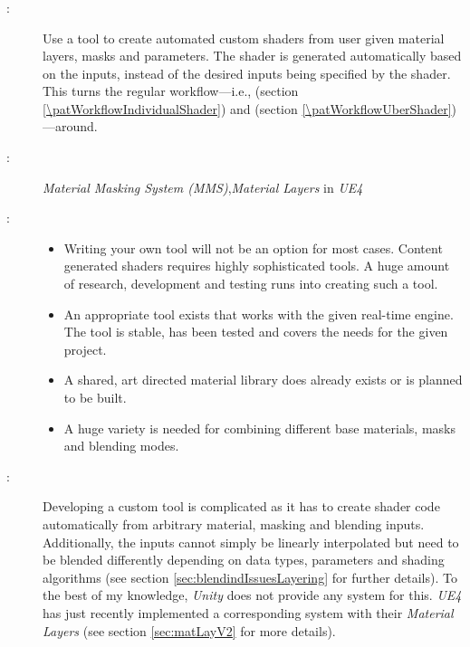 \subsubsection{\patWorkflowContentDrivenShader}\label{\patWorkflowContentDrivenShader}
\begin{description}
	\item[\patIntent:]%
	Use a tool to create automated custom shaders from user given material layers, masks and parameters. The shader is generated automatically based on the inputs, instead of the desired inputs being specified by the shader. This turns the regular workflow---i.e., \emph{\patWorkflowIndividualShader} (section \ref{\patWorkflowIndividualShader}) and \emph{\patWorkflowUberShader} (section \ref{\patWorkflowUberShader})---around.  
	\item[\patAlsoKnownAs:]%
	\emph{Material Masking System (MMS)},\emph{Material Layers} in \emph{UE4}
	\item[\patApplicability:]\hfill 
	\begin{itemize}\mynobreakpar
		\item Writing your own tool will not be an option for most cases. Content generated shaders requires highly sophisticated tools. A huge amount of research, development and testing runs into creating such a tool. 
		\item An appropriate tool exists that works with the given real-time engine. The tool is stable, has been tested and covers the needs for the given project. 
		\item A shared, art directed material library does already exists or is planned to be built. 
		\item A huge variety is needed for combining different base materials, masks and blending modes.
	\end{itemize}
	\item[\patImplementation:]%
	Developing a custom tool is complicated as it has to create shader code automatically from arbitrary material, masking and blending inputs. Additionally, the inputs cannot simply be linearly interpolated  but need to be blended differently depending on data types, parameters and shading algorithms (see section \ref{sec:blendindIssuesLayering} for further details). To the best of my knowledge, \emph{Unity} does not provide any system for this. \emph{UE4} has just recently implemented a corresponding system with their \emph{Material Layers} (see section \ref{sec:matLayV2} for more details). 	

\end{description}
